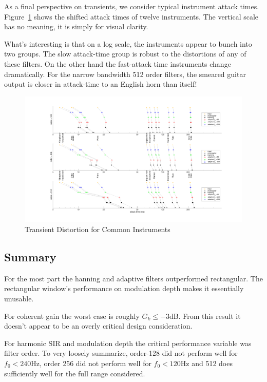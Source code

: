 \documentclass [11pt, proquest,oneside] {ganter_thesis}[2015/03/03]
\begin{document}
As a final perspective on transients, we consider typical instrument attack times.  Figure~\ref{fig:transient_3} shows the shifted attack times of twelve instruments.  The vertical scale has no meaning, it is simply for visual clarity.

What's interesting is that on a log scale, the instruments appear to bunch into two groups.  The slow attack-time group is robust to the distortions of any of these filters.  On the other hand the fast-attack time instruments change dramatically.  For the narrow bandwidth 512 order filters, the smeared guitar output is closer in attack-time to an English horn than itself!

\begin{figure}[!ht]
  \centering
    \includegraphics[width=1\textwidth]{transient_3}
    \caption{Transient Distortion for Common Instruments}\label{fig:transient_3}
\end{figure}

\clearpage

\subsection{Summary}

For the most part the hanning and adaptive filters outperformed rectangular.  The rectangular window's performance on modulation depth makes it essentially unusable.

For coherent gain the worst case is roughly $G_k \leq -3$dB.  From this result it doesn't appear to be an overly critical design consideration.

For harmonic SIR and modulation depth the critical performance variable was filter order.  To very loosely summarize, order-128 did not perform well for $f_0 < 240$Hz, order 256 did not perform well for $f_0 < 120$Hz and 512 does sufficiently well for the full range considered.
\end{document}
